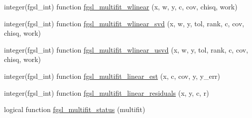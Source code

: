 \begin{DoxyCompactItemize}
\item 
integer(fgsl\-\_\-int) function \hyperlink{fit_8finc_aca3c885bfd73f86607f2dd5a818dda56}{fgsl\-\_\-multifit\-\_\-wlinear} (x, w, y, c, cov, chisq, work)
\item 
integer(fgsl\-\_\-int) function \hyperlink{fit_8finc_a0e7bfa86f1948b97bdc540a44d370f1b}{fgsl\-\_\-multifit\-\_\-wlinear\-\_\-svd} (x, w, y, tol, rank, c, cov, chisq, work)
\item 
integer(fgsl\-\_\-int) function \hyperlink{fit_8finc_a7b805f25c1bfc343d95b2183238bfb3d}{fgsl\-\_\-multifit\-\_\-wlinear\-\_\-usvd} (x, w, y, tol, rank, c, cov, chisq, work)
\item 
integer(fgsl\-\_\-int) function \hyperlink{fit_8finc_a190c5d107367d5f9039e81905cfc85f7}{fgsl\-\_\-multifit\-\_\-linear\-\_\-est} (x, c, cov, y, y\-\_\-err)
\item 
integer(fgsl\-\_\-int) function \hyperlink{fit_8finc_a6f9df5f586bf1ea89402f34d33633b97}{fgsl\-\_\-multifit\-\_\-linear\-\_\-residuals} (x, y, c, r)
\item 
logical function \hyperlink{fit_8finc_add0b89e45ce90eb1a9117d3e45e6b39e}{fgsl\-\_\-multifit\-\_\-status} (multifit)
\end{DoxyCompactItemize}


